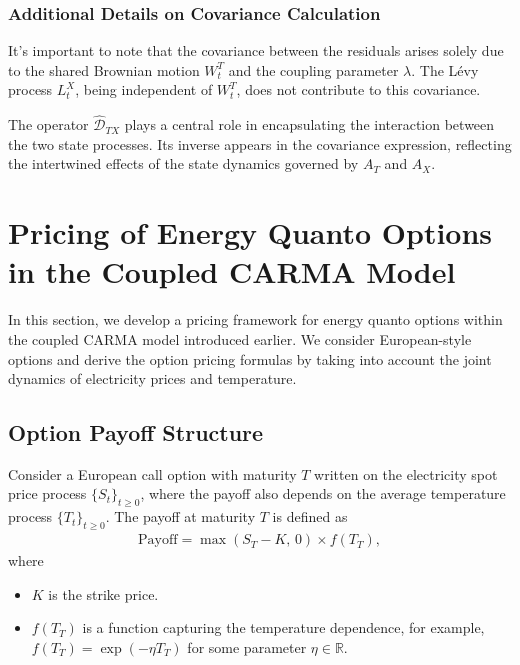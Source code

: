 \documentclass[10pt,a4paper,reqno]{amsart}
\theoremstyle{example}
\begin{document}
\subsubsection{Additional Details on Covariance Calculation}

It's important to note that the covariance between the residuals arises solely
due to the shared Brownian motion $W_t^T$ and the coupling parameter
$\lambda$. The L\'evy process $L_t^X$, being independent of $W_t^T$, does not
contribute to this covariance. 

The operator $\hat{\mathcal{D}}_{TX}$ plays a central role in encapsulating the
interaction between the two state processes. Its inverse appears in the
covariance expression, reflecting the intertwined effects of the state dynamics
governed by $A_T$ and $A_X$.  

\clearpage{}

\section{Pricing of Energy Quanto Options in the Coupled CARMA Model}\label{sec:pricing-quanto-options}


In this section, we develop a pricing framework for energy quanto options within
the coupled CARMA model introduced earlier. We consider European-style options
and derive the option pricing formulas by taking into account the joint dynamics
of electricity prices and temperature.

\subsection{Option Payoff Structure}

Consider a European call option with maturity $T$ written on the electricity spot price process $\{S_t\}_{t \geq 0}$, where the payoff also depends on the average temperature process $\{T_t\}_{t \geq 0}$. The payoff at maturity $T$ is defined as
\begin{align}
\text{Payoff} = \max\left( S_T - K,\, 0 \right) \times f(T_T), \label{eq:quanto_payoff}
\end{align}
where
\begin{itemize}
    \item $K$ is the strike price.
    \item $f(T_T)$ is a function capturing the temperature dependence, for example, $f(T_T) = \exp(- \eta T_T)$ for some parameter $\eta \in \mathbb{R}$.
\end{itemize}
\end{document}
